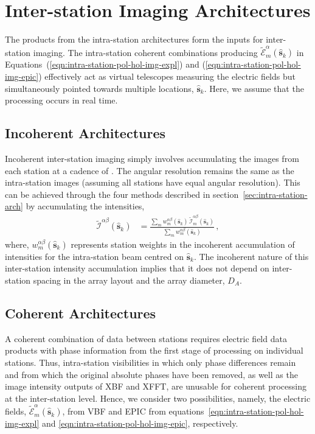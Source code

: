\documentclass[
  journal=pasa,
  manuscript=article-type,
  year=2020,
  volume=37,
]{cup-journal}
\begin{document}
\section{Inter-station Imaging Architectures} \label{sec:inter-station-arch}

The products from the intra-station architectures form the inputs for inter-station imaging. The intra-station coherent combinations producing $\widetilde{\mathcal{E}}_m^\alpha(\hat{\boldsymbol{s}}_k)$ in Equations~(\ref{eqn:intra-station-pol-hol-img-expl}) and (\ref{eqn:intra-station-pol-hol-img-epic}) effectively act as virtual telescopes measuring the electric fields but simultaneously pointed towards multiple locations, $\hat{\boldsymbol{s}}_k$. Here, we assume that the processing occurs in real time. 

\subsection{Incoherent Architectures} \label{sec:incoherent}

Incoherent inter-station imaging simply involves accumulating the images from each station at a cadence of . The angular resolution remains the same as the intra-station images (assuming all stations have equal angular resolution). This can be achieved through the four methods described in section~\ref{sec:intra-station-arch} by accumulating the intensities, 
\begin{align}
    \widetilde{\mathcal{I}}^{\alpha\beta}(\hat{\boldsymbol{s}}_k) &= \frac{\sum_m w_{m}^{\alpha\beta}(\hat{\boldsymbol{s}}_k) \, \widetilde{\mathcal{I}}_m^{\alpha\beta}(\hat{\boldsymbol{s}}_k)}{\sum_m w_{m}^{\alpha\beta}(\hat{\boldsymbol{s}}_k)} \, , \label{eqn:inter-station-incoherent-pol-images}
\end{align}
where, $w_{m}^{\alpha\beta}(\hat{\boldsymbol{s}}_k)$ represents station weights in the incoherent accumulation of intensities for the intra-station beam centred on $\hat{\boldsymbol{s}}_k$. The incoherent nature of this inter-station intensity accumulation implies that it does not depend on inter-station spacing in the array layout and the array diameter, $D_A$. 

\subsection{Coherent Architectures} \label{sec:coherent}

A coherent combination of data between stations requires electric field data products with phase information from the first stage of processing on individual stations. Thus, intra-station visibilities in which only phase differences remain and from which the original absolute phases have been removed, as well as the image intensity outputs of XBF and XFFT, are unusable for coherent processing at the inter-station level. Hence, we consider two possibilities, namely, the electric fields, $\widetilde{\mathcal{E}}_m^\alpha(\hat{\boldsymbol{s}}_k)$, from VBF and EPIC from equations~\ref{eqn:intra-station-pol-hol-img-expl} and \ref{eqn:intra-station-pol-hol-img-epic},
respectively. 
\end{document}

